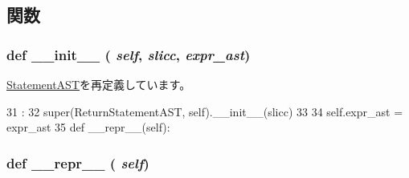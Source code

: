 \subsection{関数}
\hypertarget{classslicc_1_1ast_1_1ReturnStatementAST_1_1ReturnStatementAST_ac775ee34451fdfa742b318538164070e}{
\subsubsection[{\_\-\_\-init\_\-\_\-}]{\setlength{\rightskip}{0pt plus 5cm}def \_\-\_\-init\_\-\_\- ( {\em self}, \/   {\em slicc}, \/   {\em expr\_\-ast})}}
\label{classslicc_1_1ast_1_1ReturnStatementAST_1_1ReturnStatementAST_ac775ee34451fdfa742b318538164070e}


\hyperlink{classslicc_1_1ast_1_1StatementAST_1_1StatementAST_ac775ee34451fdfa742b318538164070e}{StatementAST}を再定義しています。


\begin{DoxyCode}
31                                        :
32         super(ReturnStatementAST, self).__init__(slicc)
33 
34         self.expr_ast = expr_ast
35 
    def __repr__(self):
\end{DoxyCode}
\hypertarget{classslicc_1_1ast_1_1ReturnStatementAST_1_1ReturnStatementAST_ad8b9328939df072e4740cd9a63189744}{
\subsubsection[{\_\-\_\-repr\_\-\_\-}]{\setlength{\rightskip}{0pt plus 5cm}def \_\-\_\-repr\_\-\_\- ( {\em self})}}
\label{classslicc_1_1ast_1_1ReturnStatementAST_1_1ReturnStatementAST_ad8b9328939df072e4740cd9a63189744}



